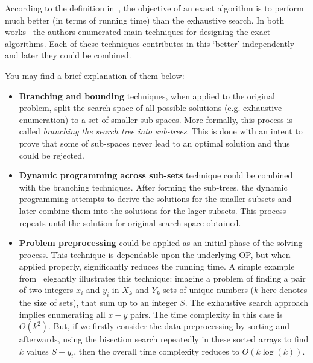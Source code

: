 According to the definition in~\cite{fomin2013exact}, the objective of an exact algorithm is to perform much better (in terms of running time) than the exhaustive search. In both works~\cite{woeginger2003exact,fomin2013exact} the authors enumerated main techniques for designing the exact algorithms. Each of these techniques contributes in this `better' independently and later they could be combined.

You may find a brief explanation of them below:
\begin{itemize}
	\item \textbf{Branching and bounding} techniques, when applied to the original problem, split the search space of all possible solutions (e.g. exhaustive enumeration) to a set of smaller sub-spaces. More formally, this process is called \emph{branching the search tree into sub-trees}. This is done with an intent to prove that some of sub-spaces never lead to an optimal solution and thus could be rejected.
	
	\item \textbf{Dynamic programming across sub-sets} technique could be combined with the  branching techniques. After forming the sub-trees, the dynamic programming attempts to derive the solutions for the smaller subsets and later combine them into the solutions for the lager subsets. This process repeats until the solution for original search space obtained.
	
	\item \textbf{Problem preprocessing} could be applied as an initial phase of the solving process. This technique is dependable upon the underlying OP, but when applied properly, significantly reduces the running time. A simple example from~\cite{woeginger2003exact} elegantly illustrates this technique: imagine a problem of finding a pair of two integers $x_i$ and $y_i$ in $X_k$ and $Y_k$ sets of unique numbers ($k$ here denotes the size of sets), that sum up to an integer $S$. The exhaustive search approach implies enumerating all $x-y$ pairs. The time complexity in this case is $O(k^2)$. But, if we firstly consider the data preprocessing by sorting and afterwards, using the bisection search repeatedly in these sorted arrays to find $k$ values $S - y_i$, then the overall time complexity reduces to $O(k\log(k))$.
\end{itemize}

